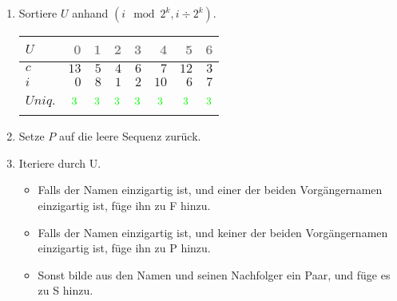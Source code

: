 \begin{enumerate}
\item 
Sortiere $U$ anhand $(i \mod 2^k, i \div 2^k)$.
\begin{center}
\small\begin{tabular}{lrrrrrrr}
    \toprule 
    $U$ & \textcolor{gray}{0} & \textcolor{gray}{1} & \textcolor{gray}{2} & \textcolor{gray}{3} & \textcolor{gray}{4} & \textcolor{gray}{5} & \textcolor{gray}{6}\\
    \midrule 
    $c$ & $13$ & $5$ & $4$ & $6$ & $7$ & $12$ & $3$ \\
    $i$ & $0$ & $8$ & $1$ & $2$ & $10$ & $6$ & $7$ \\
    $Uniq.$ & $$\cmarkc$$ & $$\cmarkc$$ & $$\cmarkc$$ & $$\cmarkc$$ & $$\cmarkc$$ & $$\cmarkc$$ & $$\cmarkc$$ \\
    \bottomrule 
\end{tabular}
\end{center}

\item 
Setze $P$ auf die leere Sequenz zurück.

\item 
Iteriere durch U.
\begin{itemize}
\item Falls der Namen einzigartig ist, und einer der beiden Vorgängernamen einzigartig ist, füge ihn zu F hinzu.
\item Falls der Namen einzigartig ist, und keiner der beiden Vorgängernamen einzigartig ist, füge ihn zu P hinzu.
\item Sonst bilde aus den Namen und seinen Nachfolger ein Paar, und füge es zu S hinzu.
\end{itemize}


\end{enumerate}
